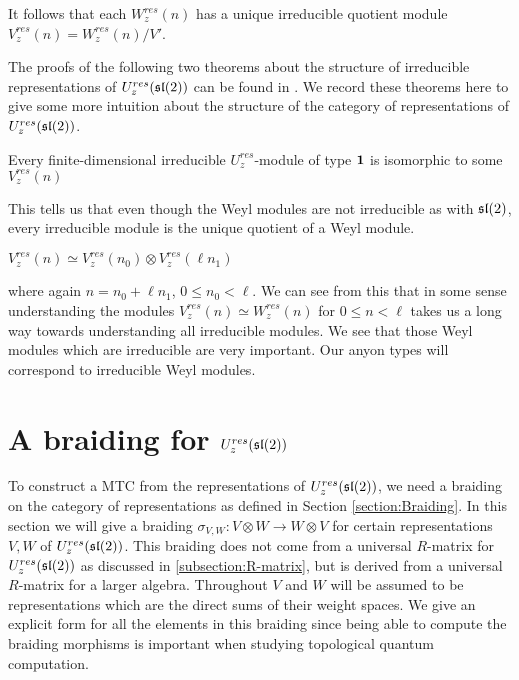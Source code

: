 It follows that each $W_z^{res}(n)$ has a unique irreducible quotient module
$V_z^{res}(n) = W_z^{res}(n) / V'$. 

The proofs of the following two theorems about the structure of irreducible
representations of $U_z^{res}(\mathfrak{sl}(2))$ can be found in \cite{CP}. We record
these theorems here to give some more intuition about the structure of the
category of representations of $U_z^{res}(\mathfrak{sl}(2))$.
\begin{theorem}
Every finite-dimensional irreducible $U_z^{res}$-module of type $\mathbf{1}$ is isomorphic to some $V_z^{res}(n)$
\end{theorem}

This tells us that even though the Weyl modules are not irreducible as with
$\mathfrak{sl}(2)$, every irreducible module is the unique quotient of a Weyl module.

\begin{theorem}
$V_z^{res}(n) \simeq V_z^{res}(n_0) \otimes V_{z}^{res}(\ell n_1)$
\end{theorem}

where again $n = n_0 + \ell n_1$, $0 \leq n_0 < \ell$.
We can see from this that in some sense understanding the modules $V_z^{res}(n)
\simeq W_z^{res}(n)$ for $0 \leq n < \ell$ takes us a long way towards
understanding all irreducible modules. We see that those Weyl modules which are
irreducible are very important. Our anyon types will correspond to irreducible
Weyl modules.

\section{A braiding for $U_z^{res}(\mathfrak{sl}(2))$}
\label{section:braiding}

To construct a MTC from the representations of $U_z^{res}(\mathfrak{sl}(2))$, we need a
braiding on the category of representations as defined in
Section \ref{section:Braiding}.  In this section we will give a braiding $\sigma_{V,W}:
V \otimes W \to W \otimes V$ for certain representations $V,W$ of
$U_z^{res}(\mathfrak{sl}(2))$.  This braiding does not
come from a universal $R$-matrix for $U_z^{res}(\mathfrak{sl}(2))$ as discussed in
\ref{subsection:R-matrix}, but is derived from a universal $R$-matrix for a
larger algebra. Throughout $V$ and $W$ will be assumed to be representations
which are the direct sums of their weight spaces. We give an explicit form for
all the elements in this braiding since being able to compute the braiding
morphisms is important when studying topological quantum computation.

